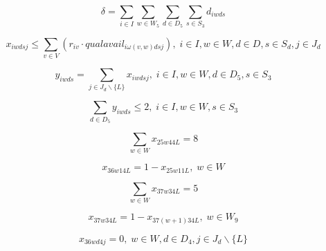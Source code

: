 \begin{equation} %
\delta = \sum_{i \in I} \sum_{w \in W_5} \sum_{d \in D_5} \sum_{s \in S_3} d_{iwds}
\end{equation}

\begin{equation}
x_{iwdsj} \leq \sum_{v \in V} (r_{iv} \cdot qualavail_{i\omega(v,w)dsj}), \; i \in I, w \in W, d \in D, s \in S_d, j \in J_d
\end{equation}

\begin{equation}
y_{iwds} = \sum_{j \in J_d \backslash \{L\}} x_{iwdsj}, \; i \in I, w \in W, d \in D_5, s \in S_3
\end{equation}

\begin{equation}
\sum_{d \in D_5} y_{iwds} \leq 2, \; i \in I, w \in W, s \in S_3
\end{equation}

\begin{equation}
\sum_{w \in W} x_{25w44L} = 8
\end{equation}

\begin{equation}
x_{36w14L} = 1 - x_{25w11L}, \; w \in W
\end{equation}

\begin{equation}
\sum_{w \in W} x_{37w34L} = 5
\end{equation}

\begin{equation}
x_{37w34L} = 1 - x_{37(w+1)34L}, \; w \in W_9
\end{equation}

\begin{equation}
x_{36wd4j} = 0, \; w \in W, d \in D_4, j \in J_d \backslash \{L\}
\end{equation}